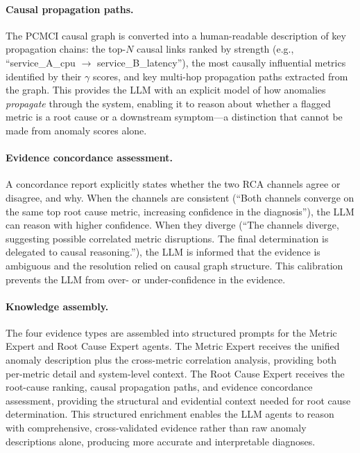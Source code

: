 \documentclass[a4paper,fleqn]{cas-dc}
\begin{document}
\paragraph{Causal propagation paths.}
The PCMCI causal graph is converted into a human-readable description of key propagation chains: the top-$N$ causal links ranked by strength (e.g., ``service\_A\_cpu $\rightarrow$ service\_B\_latency''), the most causally influential metrics identified by their $\gamma$ scores, and key multi-hop propagation paths extracted from the graph.  This provides the LLM with an explicit model of how anomalies \emph{propagate} through the system, enabling it to reason about whether a flagged metric is a root cause or a downstream symptom---a distinction that cannot be made from anomaly scores alone.

\paragraph{Evidence concordance assessment.}
A concordance report explicitly states whether the two RCA channels agree or disagree, and why.  When the channels are consistent (``Both channels converge on the same top root cause metric, increasing confidence in the diagnosis''), the LLM can reason with higher confidence.  When they diverge (``The channels diverge, suggesting possible correlated metric disruptions.  The final determination is delegated to causal reasoning.''), the LLM is informed that the evidence is ambiguous and the resolution relied on causal graph structure.  This calibration prevents the LLM from over- or under-confidence in the evidence.

\paragraph{Knowledge assembly.}
The four evidence types are assembled into structured prompts for the Metric Expert and Root Cause Expert agents.  The Metric Expert receives the unified anomaly description plus the cross-metric correlation analysis, providing both per-metric detail and system-level context.  The Root Cause Expert receives the root-cause ranking, causal propagation paths, and evidence concordance assessment, providing the structural and evidential context needed for root cause determination.  This structured enrichment enables the LLM agents to reason with comprehensive, cross-validated evidence rather than raw anomaly descriptions alone, producing more accurate and interpretable diagnoses.
\end{document}
